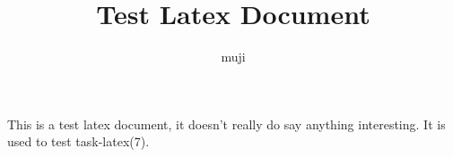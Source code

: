 \documentclass[a4paper,oneside,twocolumns]{article}
\title{Test Latex Document}
\author{muji}
\renewcommand{\paragraph}{\large}
\begin{document}
\fancyhead{}
\fancyfoot{}

\lfoot{\thepage}

\clearpage

%
%

\paragraph{\normalsize{This is a test latex document, it doesn't really do say anything interesting. It is used to test task-latex(7).}}
\end{document}
